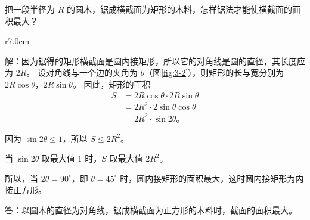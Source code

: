 \liti 把一段半径为 $R$ 的圆木，锯成横截面为矩形的木料，怎样锯法才能使横截面的面积最大？

\begin{wrapfigure}[10]{r}{7.0cm}
    \centering
    
    \caption{}\label{fig:3-2}
\end{wrapfigure}

解：因为锯得的矩形横截面是圆内接矩形，所以它的对角线是圆的直径，其长度应为 $2R$。
设对角线与一个边的夹角为 $\theta$（图\ref{fig:3-2}），则矩形的长与宽分别为 $2R\cos\theta$，$2R\sin\theta$。
因此，矩形的面积
\begin{align*}
    S &= 2R\cos\theta \cdot 2R\sin\theta \\
      &= 2R^2 \cdot 2\sin\theta \cos\theta \\
      &= 2R^2 \cdot \sin2\theta \text{。}
\end{align*}

因为 $\sin2\theta \leqslant 1$，所以 $S \leqslant 2R^2$。

当 $\sin2\theta$ 取最大值 $1$ 时，$S$ 取最大值 $2R^2$。

所以，当 $2\theta = 90^\circ$，即 $\theta = 45^\circ$ 时，圆内接矩形的面积最大，这时圆内接矩形为内接正方形。

答：以圆木的直径为对角线，锯成横截面为正方形的木料时，截面的面积最大。

